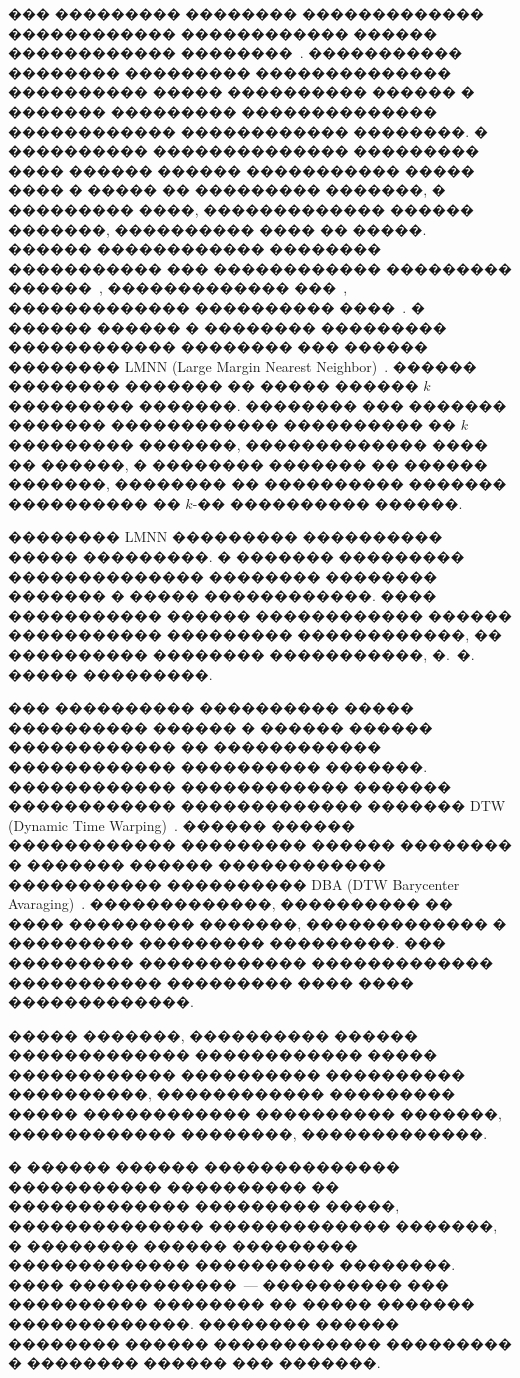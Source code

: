 \documentclass[12pt,twoside, notitlepage]{article}
\begin{document}
��� ��������� �������� ������������� ������������ ������������ ������ ������������ ��������~\cite{bellet2013mlsurvey, yang2006mlsurvey2, wang2015mlsurvey3}.
����������� �������� ��������� �������������� ���������� ����� ���������� ������ � ������� ��������� �������������� ������������ ������������ ��������.
� ���������� �������������� ��������� ���� ������ ������ ����������� ����� ���� � ����� �� ��������� �������, � ��������� ����, ������������� ������ �������, ���������� ���� �� �����.
������ ������������ �������� ����������� ��� ������������ ��������� ������~\cite{mcfee2010mlranking}, ������������� ���~\cite{guillaumin2009mlface}, ������������� ���������� ����~\cite{weinberger2008mldigits}.
� ������ ������ � �������� ��������� ������������ �������� ��� ������ �������� LMNN (Large Margin Nearest Neighbor)~\cite{weinberger2005lmnn}.
������ �������� ������� �� ����� ������ $k$ ��������� �������.
�������� ��� ������� ������� ������������ ���������� �� $k$ ��������� �������, ������������� ���� �� ������, � �������� ������� �� ������ �������, �������� �� ���������� ������� ���������� �� $k$-�� ���������� ������.

�������� LMNN ��������� ���������� ����� ���������.
� ������� ��������� �������������� �������� �������� ������� � ����� ������������.
���� ����������� ������ ������������ ������ ����������� ��������� ������������, �� ���������� �������� �����������, �.~�. ����� ���������.

��� ���������� ���������� ����� ���������� ������ � ������ ������ ������������ �� ������������ ������������ ���������� �������.
������������ ������������ ������� ������������ ������������� ������� DTW (Dynamic Time Warping)~\cite{berndt1994dtw}.
������ ������ ������������ ��������� ������ �������� � ������� ������ ������������ ����������� ���������� DBA (DTW Barycenter Avaraging)~\cite{petitjean2011dba}.
�������������, ���������� �� ���� ��������� �������, ������������� � ��������� ��������� ���������.
��� ��������� ������������ ������������� ����������� ��������� ���� ���� �������������.

����� �������, ���������� ������ ������������� ������������ ����� ������������ ���������� ���������� ����������, ������������ ��������� ����� ������������ ���������� �������, ������������ ��������, �������������.

� ������ ������ �������������� ����������� ���������� �� ������������� ��������� �����, �������������� ������������� �������, � �������� ������ ��������� ������������� ���������� ��������.
���� ������������~--- ���������� ��� ���������� �������� �� ����� ������� �������������.
�������� ������ �������� ������ ������������ ��������� � �������� ������ ��� �������.
\end{document}
